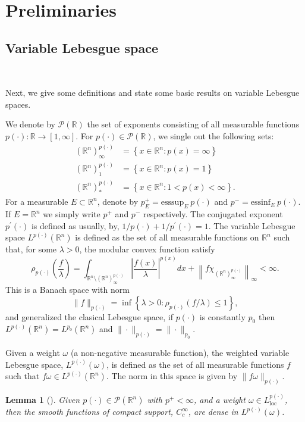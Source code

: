 \documentclass[a4paper,11pt,reqno]{amsart}
\theoremstyle{plain}
\numberwithin{equation}{section}
\newtheorem{lema}[teo]{Lemma}
\theoremstyle{definition}
\newcommand{\R}{{\mathbb{R}^n}}
\begin{document}
\section{Preliminaries}\label{sec 2}
\subsection{Variable Lebesgue space}
\

Next, we give some definitions and state some basic results on variable Lebesgue spaces.

We denote by $\mathcal{P}(\mathbb{R})$ the set of exponents consisting of all measurable functions $p(\cdot): \mathbb{R} \to [1,\infty]$. For $p(\cdot) \in \mathcal{P}(\mathbb{R})$, we single out the following sets:
 \begin{align*}
 (\R)^{p(\cdot)}_\infty&=\left\{x\in\R : p(x)=\infty\right\}\\
 (\R)^{p(\cdot)}_1&=\left\{x\in\R : p(x)=1\right\}\\
 (\R)^{p(\cdot)}_*&=\left\{x\in\R : 1<p(x)<\infty\right\}.
 \end{align*} 
 For a measurable $E\subset\R$, denote by $p^+_E=\text{esssup}_E\ p(\cdot)$ and $p^-=\text{essinf}_E\ p(\cdot)$. If $E=\R$ we simply write $p^+$ and $p^-$ respectively. The conjugated exponent $p^\prime(\cdot)$ is defined as usually, by, 
 $1/p(\cdot)+1/p^\prime(\cdot)=1$.
  The variable Lebesgue space $L^{p(\cdot)}(\R)$ is defined as the set of all measurable functions on $\R$ such that, for some $\lambda>0$, the modular convex function satisfy
\begin{equation*}
	\rho_{p(\cdot)}\left(\frac{f}{\lambda}\right)=\int_{\R\setminus(\R)^{p(\cdot)}_\infty}\left|\frac{f(x)}{\lambda}\right|^{p(x)}dx+\left\|f\chi_{(\R)^{p(\cdot)}_\infty}\right\|_\infty<\infty.
\end{equation*}
This is a Banach space with norm
\begin{equation}\label{def norma}
	\|f\|_{p(\cdot)}=\inf\left\{\lambda>0:	\rho_{p(\cdot)}(f/\lambda)\leq 1\right\},
\end{equation}
and generalized the clasical Lebesgue space, if $p(\cdot)$ is constantly $p_0$ then $L^{p(\cdot)}(\R)=L^{p_0}(\R)$ and $\|\cdot\|_{p(\cdot)}=\|\cdot\|_{p_0}$.

Given a weight $\omega$ (a non-negative measurable function), the weighted variable Lebesgue space, $L^{p(\cdot)}(\omega)$, is defined as the set of all measurable functions $f$ such that $f\omega\in L^{p(\cdot)}(\R)$. The norm in this space is given by $\|f\omega\|_{p(\cdot)}$.
\begin{lema}[\cite{Extrapol con pesos}]\label{densidad en Lp de omega}
	Given $p(\cdot)\in \mathcal{P}(\R)$ with $p^+<\infty$, and a weight $\omega\in L_{\text{loc}}^{p(\cdot)}$, then the smooth functions of compact support, $C^\infty_c$, are dense in $L^{p(\cdot)}(\omega)$.
\end{lema}
\end{document}
